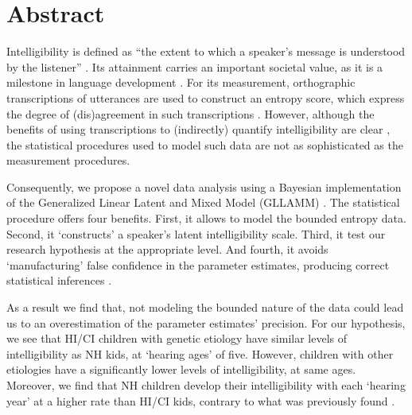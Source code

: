 \section*{Abstract}

Intelligibility is defined as ``the extent to which a speaker’s message is understood by the listener'' \cite{Munro_et_al_1999}. Its attainment carries an important societal value, as it is a milestone in language development \cite{Chin_et_al_2012}. For its measurement, orthographic transcriptions of utterances are used to construct an entropy score, which express the degree of (dis)agreement in such transcriptions \cite{Boonen_et_al_2021, Shannon_1948}. However, although the benefits of using transcriptions to (indirectly) quantify intelligibility are clear \cite{Boonen_et_al_2020, Boonen_et_al_2021, Hustad_et_al_2020}, the statistical procedures used to model such data are not as sophisticated as the measurement procedures.

Consequently, we propose a novel data analysis using a Bayesian implementation of the Generalized Linear Latent and Mixed Model (GLLAMM) \cite{Rabe_et_al_2004a, Rabe_et_al_2004b, Rabe_et_al_2004c, Rabe_et_al_2012, Skrondal_et_al_2004a}. The statistical procedure offers four benefits. First, it allows to model the bounded entropy data. Second, it `constructs' a speaker's latent intelligibility scale. Third, it test our research hypothesis at the appropriate level. And fourth, it avoids `manufacturing' false confidence in the parameter estimates, producing correct statistical inferences \cite{McElreath_2020}.

As a result we find that, not modeling the bounded nature of the data could lead us to an overestimation of the parameter estimates' precision. For our hypothesis, we see that HI/CI children with genetic etiology have similar levels of intelligibility as NH kids, at `hearing ages' of five. However, children with other etiologies have a significantly lower levels of intelligibility, at same ages. Moreover, we find that NH children develop their intelligibility with each `hearing year' at a higher rate than HI/CI kids, contrary to what was previously found \cite{Boonen_et_al_2021}.
